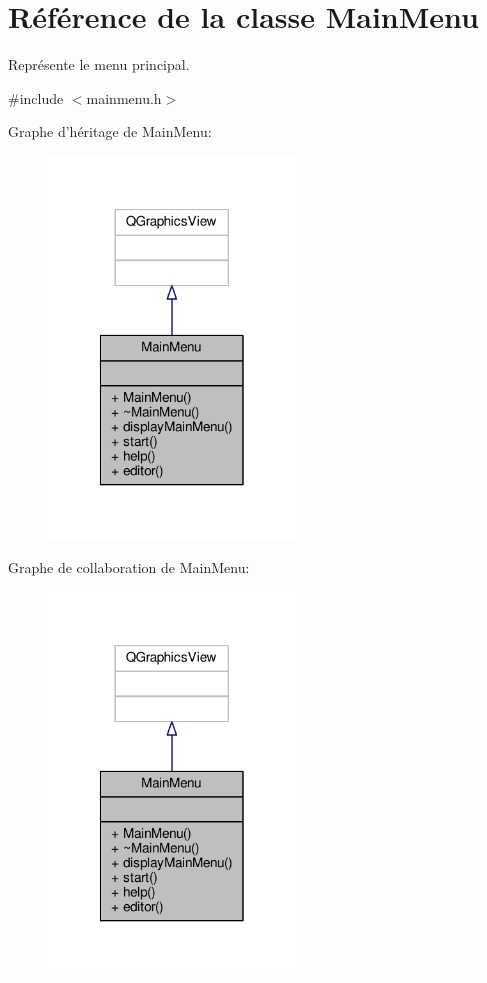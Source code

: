 \hypertarget{classMainMenu}{\section{Référence de la classe Main\+Menu}
\label{classMainMenu}
}


Représente le menu principal.  




{\ttfamily \#include $<$mainmenu.\+h$>$}



Graphe d'héritage de Main\+Menu\+:\nopagebreak
\begin{figure}[H]
\begin{center}
\leavevmode
\includegraphics[width=186pt]{db/d55/classMainMenu__inherit__graph}
\end{center}
\end{figure}


Graphe de collaboration de Main\+Menu\+:\nopagebreak
\begin{figure}[H]
\begin{center}
\leavevmode
\includegraphics[width=186pt]{d8/d60/classMainMenu__coll__graph}
\end{center}
\end{figure}
